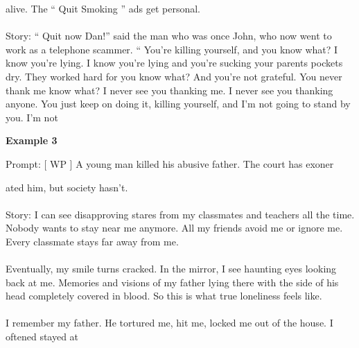 \begin{tcolorbox}[
    base style,
    colback=boxcolor,
    coltitle=white,
    colbacktitle=headercolor,
    title=\sys Generation
]
{\color{red}alive. The `` Quit Smoking '' ads get personal.
\\
\\
\text{\#\#\#} Story: `` Quit now Dan!'' said the man} who was once John, who now went to work as a telephone scammer. `` You're killing yourself, and you know what? I know you're lying. I know you're lying and you're sucking your parents pockets dry. They worked hard for you know what? And you're not grateful. You never thank me know what? I never see you thanking me. I never see you thanking anyone. You just keep on doing it, killing yourself, and I'm not going to stand by you. I'm not
\end{tcolorbox}

\newpage
\textbf{Example 3}


\begin{tcolorbox}[
    base style,
    colback=boxcolor,
    coltitle=white,
    colbacktitle=headercolor,
    title=Prefix
]
\text{\#\#\#} Prompt: [ WP ] A young man killed his abusive father. The court has exoner
\end{tcolorbox}

\vspace{2mm}

\begin{tcolorbox}[
    base style,
    colback=boxcolor,
    coltitle=white,
    colbacktitle=headercolor,
    title=Suffix
]
ated him, but society hasn't.
\\
\\
\text{\#\#\#} Story: I can see disapproving stares from my classmates and teachers all the time. Nobody wants to stay near me anymore. All my friends avoid me or ignore me. Every classmate stays far away from me. 
\\
\\
Eventually, my smile turns cracked. In the mirror, I see haunting eyes looking back at me. Memories and visions of my father lying there with the side of his head completely covered in blood. So this is what true loneliness feels like. 
\\
\\
I remember my father. He tortured me, hit me, locked me out of the house. I oftened stayed at
\end{tcolorbox}

